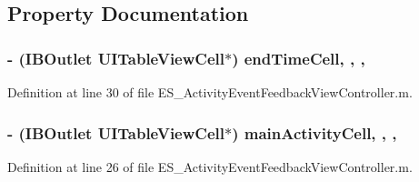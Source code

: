 \subsection{Property Documentation}
\hypertarget{category_e_s___activity_event_feedback_view_controller_07_08_a92548b7815868a6d0e658ee93740e12c}{
\subsubsection[{end\+Time\+Cell}]{\setlength{\rightskip}{0pt plus 5cm}-\/ (I\+B\+Outlet U\+I\+Table\+View\+Cell$\ast$) end\+Time\+Cell\hspace{0.3cm}{\ttfamily [read]}, {\ttfamily [write]}, {\ttfamily [nonatomic]}, {\ttfamily [weak]}}}\label{category_e_s___activity_event_feedback_view_controller_07_08_a92548b7815868a6d0e658ee93740e12c}


Definition at line 30 of file E\+S\+\_\+\+Activity\+Event\+Feedback\+View\+Controller.\+m.

\hypertarget{category_e_s___activity_event_feedback_view_controller_07_08_a0990230bcdde5ff9e57b6fdbdc93e1f3}{
\subsubsection[{main\+Activity\+Cell}]{\setlength{\rightskip}{0pt plus 5cm}-\/ (I\+B\+Outlet U\+I\+Table\+View\+Cell$\ast$) main\+Activity\+Cell\hspace{0.3cm}{\ttfamily [read]}, {\ttfamily [write]}, {\ttfamily [nonatomic]}, {\ttfamily [weak]}}}\label{category_e_s___activity_event_feedback_view_controller_07_08_a0990230bcdde5ff9e57b6fdbdc93e1f3}


Definition at line 26 of file E\+S\+\_\+\+Activity\+Event\+Feedback\+View\+Controller.\+m.

